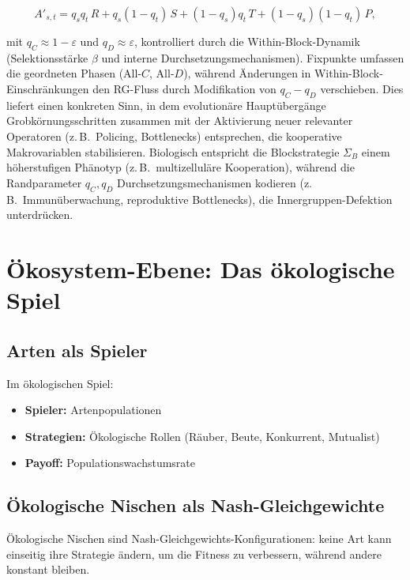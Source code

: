 \documentclass[12pt,a4paper]{article}
\theoremstyle{remark}
\begin{document}
\[
A'_{s,t}
= q_s q_t\,R + q_s(1-q_t)\,S + (1-q_s)q_t\,T + (1-q_s)(1-q_t)\,P,
\]

mit $q_C\approx 1-\varepsilon$ und $q_D\approx \varepsilon$, kontrolliert durch die Within-Block-Dynamik (Selektionsst\"arke $\beta$ und interne Durchsetzungsmechanismen).
Fixpunkte umfassen die geordneten Phasen (All-$C$, All-$D$), w\"ahrend \"Anderungen in Within-Block-Einschr\"ankungen den RG-Fluss durch Modifikation von $q_C-q_D$ verschieben.
Dies liefert einen konkreten Sinn, in dem evolution\"are Haupt\"uberg\"ange Grobk\"ornungsschritten zusammen mit der Aktivierung neuer relevanter Operatoren (z.\,B.\ Policing, Bottlenecks) entsprechen, die kooperative Makrovariablen stabilisieren. Biologisch entspricht die Blockstrategie $\Sigma_B$ einem h\"oherstufigen Ph\"anotyp (z.\,B.\ multizellul\"are Kooperation), w\"ahrend die Randparameter $q_C, q_D$ Durchsetzungsmechanismen kodieren (z.\,B.\ Immun\"uberwachung, reproduktive Bottlenecks), die Innergruppen-Defektion unterdr\"ucken.

\section{\"Okosystem-Ebene: Das \"okologische Spiel}
\label{sec:ecosystem}

\subsection{Arten als Spieler}

Im \"okologischen Spiel:
\begin{itemize}
    \item \textbf{Spieler:} Artenpopulationen
    \item \textbf{Strategien:} \"Okologische Rollen (R\"auber, Beute, Konkurrent, Mutualist)
    \item \textbf{Payoff:} Populationswachstumsrate
\end{itemize}

\subsection{\"Okologische Nischen als Nash-Gleichgewichte}

\"Okologische Nischen sind Nash-Gleichgewichts-Konfigurationen: keine Art kann einseitig ihre Strategie \"andern, um die Fitness zu verbessern, w\"ahrend andere konstant bleiben.
\end{document}
